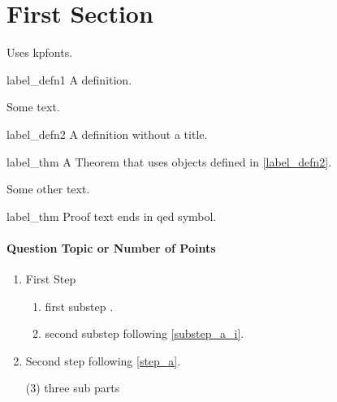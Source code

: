 \documentclass{worksheet}
\begin{document}
	\boldmath
	\maketitle
    \vspace{-1em}
	
 
	\section{First Section}
    
    Uses kpfonts.
	
	\begin{defn}{label_defn1}
	A definition.
	\end{defn}
	    
	Some text.
	    
	    
	\begin{defn}[]{label_defn2}
	A definition without a title.
	\end{defn}
    


    \begin{theo}{label_thm}
	A Theorem that uses objects defined in \cref{label_defn2}. 
	\end{theo}
	
	Some other text.
    
    \begin{prf}{label_thm}
    Proof text ends in qed symbol.
    \end{prf}
    

    \paragraph{Question Topic or Number of Points}
    \begin{enumerate}
        \item First Step \label{step_a}
        \begin{enumerate}
            \item  first substep \label{substep_a_i}.
            \item  second substep following \ref{substep_a_i}.
        \end{enumerate}
        \item Second step following \ref{step_a}.
        \begin{tasks}(3)
        \task three 
        \task sub 
        \task parts
        \end{tasks}
    \end{enumerate}
    
\end{document}
